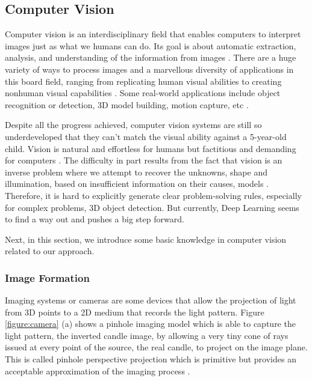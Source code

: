\documentclass[a4paper,12pt]{article}
\begin{document}
\clearpage

\subsection{Computer Vision}
\label{cv}

Computer vision is an interdisciplinary field that  enables computers to interpret images just as what we humans can do. Its goal is about automatic extraction, analysis, and understanding of the information from images \cite{BMVA}. There are a huge variety of ways to process images and a marvellous diversity of applications in this board field, ranging from replicating human visual abilities to creating nonhuman visual capabilities \cite{Goodfellow-et-al-2016}. Some real-world applications include object recognition or detection, 3D model building, motion capture, etc \cite{szeliski2011computer}.

Despite all the progress achieved, computer vision systems are still so underdeveloped that they can't match the visual ability against a 5-year-old child. Vision is natural and effortless for humans but factitious and demanding for computers \cite{parallel}. The difficulty in part results from the fact that vision is an inverse problem where we attempt to recover the unknowns, \eg shape and illumination,  based on insufficient information on their causes, \eg models \cite{szeliski2011computer}.  Therefore, it is hard to  explicitly generate  clear problem-solving rules, especially for complex problems, \eg 3D object detection. But currently, Deep Learning seems to find a way out and pushes a big step forward.

Next, in this section, we introduce some basic knowledge in computer vision related to our approach.

\subsubsection{Image Formation}

Imaging systems or cameras are some devices that allow the projection of light from 3D points to a 2D medium that records the light pattern. Figure \ref{figure:camera} (a) shows a pinhole imaging model which is able to capture the light pattern, the inverted candle image, by allowing a very tiny cone of rays issued  at every point of the source, the real candle,  to project on the image plane. This is called pinhole perspective projection which is primitive but provides an acceptable approximation of the imaging process \cite{Forsyth:2002:CVM:580035}. 
\end{document}

